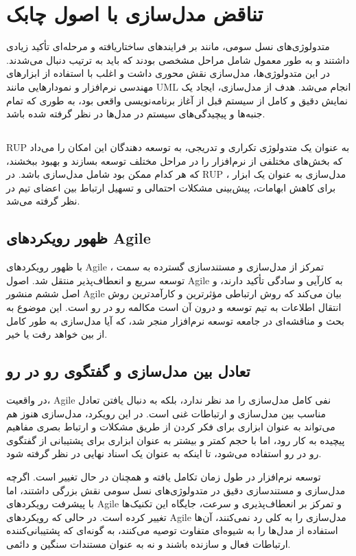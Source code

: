 \section*{تناقض مدل‌سازی با اصول چابک}

متدولوژی‌های نسل سومی، مانند
بر فرایندهای ساختاریافته و مرحله‌ای تأکید زیادی داشتند و به طور معمول شامل مراحل مشخصی بودند که باید به ترتیب دنبال می‌شدند. در این متدولوژی‌ها، مدل‌سازی نقش محوری داشت و اغلب با استفاده از ابزارهای مهندسی نرم‌افزار و نمودارهایی مانند UML انجام می‌شد. هدف از مدل‌سازی، ایجاد یک نمایش دقیق و کامل از سیستم قبل از آغاز برنامه‌نویسی واقعی بود، به طوری که تمام جنبه‌ها و پیچیدگی‌های سیستم در مدل‌ها در نظر گرفته شده باشد.

\subsection*{}
RUP
به عنوان یک متدولوژی تکراری و تدریجی، به توسعه دهندگان این امکان را می‌داد که بخش‌های مختلفی از نرم‌افزار را در مراحل مختلف توسعه بسازند و بهبود ببخشند، که هر کدام ممکن بود شامل مدل‌سازی باشد. در RUP ، مدل‌سازی به عنوان یک ابزار برای کاهش ابهامات، پیش‌بینی مشکلات احتمالی و تسهیل ارتباط بین اعضای تیم در نظر گرفته می‌شد.

\subsection*{ظهور رویکردهای Agile}
با ظهور رویکردهای Agile ، تمرکز از مدل‌سازی و مستندسازی گسترده به سمت توسعه سریع و انعطاف‌پذیر منتقل شد. اصول Agile به کارآیی و سادگی تأکید دارند، و اصل ششم منشور Agile بیان می‌کند که روش ارتباطی مؤثرترین و کارآمدترین روش انتقال اطلاعات به تیم توسعه و درون آن است مکالمه رو در رو است. این موضوع به بحث و مناقشه‌ای در جامعه توسعه نرم‌افزار منجر شد، که آیا مدل‌سازی به طور کامل از بین خواهد رفت یا خیر.

\subsection*{تعادل بین مدل‌سازی و گفتگوی رو در رو}
در واقعیت، Agile نفی کامل مدل‌سازی را مد نظر ندارد، بلکه به دنبال یافتن تعادل مناسب بین مدل‌سازی و ارتباطات غنی است. در این رویکرد، مدل‌سازی هنوز هم می‌تواند به عنوان ابزاری برای فکر کردن از طریق مشکلات و ارتباط بصری مفاهیم پیچیده به کار رود، اما با حجم کمتر و بیشتر به عنوان ابزاری برای پشتیبانی از گفتگوی رو در رو استفاده می‌شود، تا اینکه به عنوان یک اسناد نهایی در نظر گرفته شود.

توسعه نرم‌افزار در طول زمان تکامل یافته و همچنان در حال تغییر است. اگرچه مدل‌سازی و مستندسازی دقیق در متدولوژی‌های نسل سومی نقش بزرگی داشتند، اما با پیشرفت رویکردهای Agile و تمرکز بر انعطاف‌پذیری و سرعت، جایگاه این تکنیک‌ها تغییر کرده است. در حالی که رویکردهای Agile مدل‌سازی را به کلی رد نمی‌کنند، آن‌ها استفاده از مدل‌ها را به شیوه‌ای متفاوت توصیه می‌کنند، به گونه‌ای که پشتیبانی‌کننده ارتباطات فعال و سازنده باشند و نه به عنوان مستندات سنگین و دائمی.